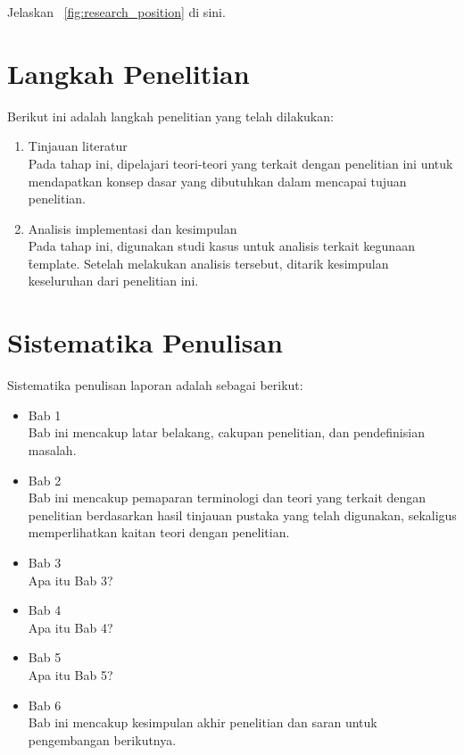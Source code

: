 Jelaskan \pic~\ref{fig:research_position} di sini.


\section{Langkah Penelitian}
Berikut ini adalah langkah penelitian yang telah dilakukan:
\begin{enumerate}
	\item Tinjauan literatur \\
	Pada tahap ini, dipelajari teori-teori yang terkait dengan penelitian ini untuk mendapatkan konsep dasar yang dibutuhkan dalam mencapai tujuan penelitian.
	\item Analisis implementasi dan kesimpulan \\
	Pada tahap ini, digunakan studi kasus untuk analisis terkait kegunaan \f{template}. Setelah melakukan analisis tersebut, ditarik kesimpulan keseluruhan dari penelitian ini.
\end{enumerate}


\section{Sistematika Penulisan}
Sistematika penulisan laporan adalah sebagai berikut:
\begin{itemize}
	\item Bab 1 \babSatu \\
	    Bab ini mencakup latar belakang, cakupan penelitian, dan pendefinisian masalah.
	\item Bab 2 \babDua \\
	    Bab ini mencakup pemaparan terminologi dan teori yang terkait dengan penelitian berdasarkan hasil tinjauan pustaka yang telah digunakan, sekaligus memperlihatkan kaitan teori dengan penelitian.
	\item Bab 3 \babTiga \\
	    Apa itu Bab 3?
	\item Bab 4 \babEmpat \\
		Apa itu Bab 4?
	\item Bab 5 \babLima \\
	    Apa itu Bab 5?
	\item Bab 6 \kesimpulan \\
	    Bab ini mencakup kesimpulan akhir penelitian dan saran untuk pengembangan berikutnya.
\end{itemize}
